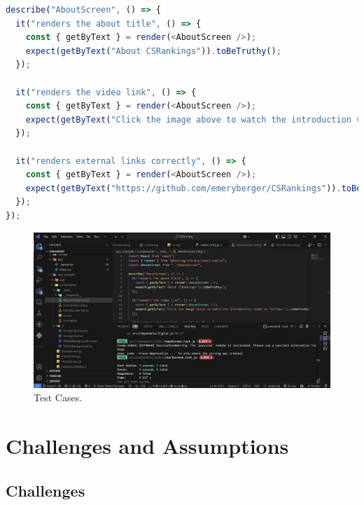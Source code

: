 \documentclass[12pt]{article}
\begin{document}
\begin{enumerate}
\begin{lstlisting}[language=JavaScript, caption={AboutScreen Tests}, label={lst:AboutScreen}]
describe("AboutScreen", () => {
  it("renders the about title", () => {
    const { getByText } = render(<AboutScreen />);
    expect(getByText("About CSRankings")).toBeTruthy();
  });

  it("renders the video link", () => {
    const { getByText } = render(<AboutScreen />);
    expect(getByText("Click the image above to watch the introduction video on YouTube.")).toBeTruthy();
  });

  it("renders external links correctly", () => {
    const { getByText } = render(<AboutScreen />);
    expect(getByText("https://github.com/emeryberger/CSRankings")).toBeTruthy();
  });
});
\end{lstlisting}

\end{enumerate}

\begin{figure}[H]
    \centering
    \includegraphics[width=1\textwidth, height=0.5\textheight]{testcases.png} %
    \caption{Test Cases.}
    \label{fig:example_image}
\end{figure}

\setcounter{section}{6} %

\section{Challenges and Assumptions}

\subsection{Challenges}
\end{document}
